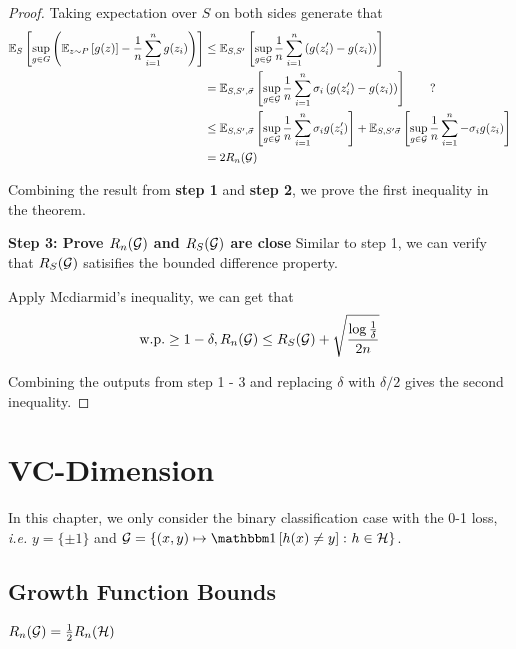 \begin{proof}
    Taking expectation over \(S\) on both sides generate that 
    \begin{align*}
        \mathbb{E}_S \left[ \sup_{g\in G} \left(\mathbb{E}_{z\sim P}\left[ g(z) \right] - \frac{1}{n}\sum_{i=1}^n g(z_i)\right) \right]
        &\leq \mathbb{E}_{S,S'} \left[ \sup_{g\in \mathcal{G}} \frac{1}{n} \sum_{i=1}^n \left(g(z_i') - g(z_i)\right) \right] \\ 
        &= \mathbb{E}_{S, S', \vec{\sigma}} \left[ \sup_{g \in \mathcal{G}} \frac{1}{n} \sum_{i=1}^n \sigma_i 
        \left(g(z_i') - g(z_i)\right) \right]  \tag*{?}\\
        &\leq \mathbb{E}_{S, S', \vec{\sigma}} \left[ \sup_{g \in \mathcal{G}} \frac{1}{n} \sum_{i=1}^n \sigma_i g(z_i') \right]
        + \mathbb{E}_{S, S' \vec{\sigma}} \left[ \sup_{g\in\mathcal{G}}\frac{1}{n}\sum_{i=1}^n - \sigma_i g(z_i) \right] \\ 
        &= 2 R_n (\mathcal{G})
    \end{align*}

    Combining the result from \textbf{step 1} and \textbf{step 2}, we prove the first inequality in the theorem. 

    \textbf{Step 3: Prove \(R_n(\mathcal{G})\) and \(R_S(\mathcal{G})\) are close}
    Similar to step 1, we can verify that \(R_S(\mathcal{G})\) satisifies the bounded difference property. 
    
    Apply Mcdiarmid's inequality, we can get that 
    \[
      \text{w.p.} \geq 1 - \delta, R_n(\mathcal{G}) \leq R_S (\mathcal{G}) + \sqrt{\frac{\log \frac{1}{\delta}}{2n}}    
    \]

    Combining the outputs from step 1 - 3 and replacing \(\delta\) with \(\delta / 2\) gives the second 
    inequality. 
\end{proof}



\chapter{VC-Dimension}

In this chapter, we only consider the binary classification case with the 0-1 loss, 
\emph{i.e.} \(y = \{ \pm 1\}\) and \(\G = \{(x, y) \mapsto \indi \midBrac{h(x)\neq y} \colon h \in \Hcal \}\).

\section{Growth Function Bounds}

\begin{lemma}\label{lem:rnG and rnH}
    \(R_n (\mathcal{G}) = \frac{1}{2} R_n (\mathcal{H})\)
\end{lemma}

